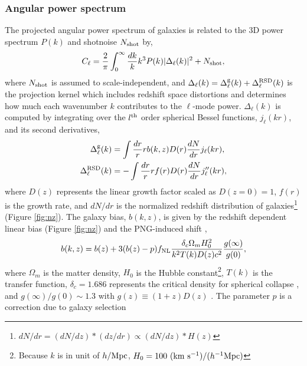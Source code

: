 \subsubsection{Angular power spectrum}
The projected angular power spectrum of galaxies is related to the 3D power spectrum $P(k)$  \citep[see, e.g.,][]{Padmanabhan2007} and shotnoise $N_{\rm shot}$ by,
\begin{equation}\label{eq:cell}
    C_{\ell} = \frac{2}{\pi}\int_{0}^{\infty}\frac{dk}{k}k^{3}P(k)|\Delta_{\ell}(k)|^{2} + N_{\rm shot},
\end{equation}
where $N_{\rm shot}$ is assumed to scale-independent, and $\Delta_{\ell}(k) = \Delta^{\rm g}_{\ell}(k) + \Delta^{\rm RSD}_{\ell}(k)$ is the projection kernel which includes redshift space distortions and determines how much each wavenumber $k$ contributes to the $\ell$-mode power. $\Delta_{\ell}(k)$ is computed by integrating over the $l^{\rm th}$ order spherical Bessel functions, $ j_{\ell}(kr)$, and its second derivatives,
\begin{align}
    \Delta^{\rm g}_{\ell}(k) &= \int \frac{dr}{r} r b(k, z) D(r) \frac{dN}{dr} j_{\ell}(kr),\\
    \Delta^{\rm RSD}_{\ell}(k) &= - \int \frac{dr}{r} r f(r) D(r) \frac{dN}{dr} j^{\prime\prime}_{\ell}(kr),
\end{align}
where $D(z)$ represents the linear growth factor scaled as $D(z=0)=1$, $f(r)$ is the growth rate, and $dN/dr$ is the normalized redshift distribution of galaxies\footnote{$dN/dr = (dN/dz)*(dz/dr) \propto (dN/dz)*H(z)$} (Figure \ref{fig:nz}). The galaxy bias, $b(k,z)$, is given by the redshift dependent linear bias (Figure \ref{fig:nz}) and the PNG-induced shift \citep{slosar2008constraints},
\begin{equation}
b(k, z) = b(z) + 3 (b(z) - p) f_{\rm NL} \frac{\delta_{c} \Omega_{m} H^{2}_{0}}{k^{2}T(k)D(z) c^{2}} \frac{g(\infty)}{g(0)},
\end{equation}
where $\Omega_{m}$ is the matter density, $H_{0}$ is the Hubble constant\footnote{Because $k$ is in unit of $h/{\rm Mpc}$, $H_{0}=100~({\rm km}~{\rm s}^{-1})/(h^{-1}{\rm Mpc})$}, $T(k)$ is the transfer function, $\delta_{c}=1.686$ represents the critical density for spherical collapse \citep{fillmore1984self}, and $g(\infty)/g(0) \sim 1.3$ with $g(z)\equiv (1+z) D(z)$ . The parameter $p$ is a correction due to galaxy selection
